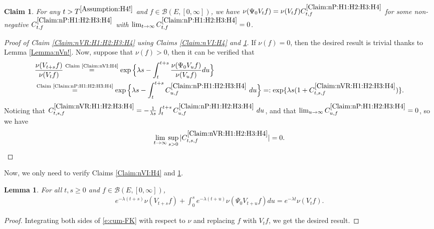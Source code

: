\documentclass[12pt,a4paper]{amsart}
\numberwithin{equation}{section}
\theoremstyle{plain}
\newtheorem{lem}[thm]{Lemma}
\newtheorem{claim}[thm]{Claim}
\theoremstyle{definition}
\theoremstyle{remark}
\newcounter{N}
\newcounter{n}[N]
\begin{document}
\begin{claim} \label{Claim:nP:H1:H2:H3:H4} 
For any $t > T^{\ref{Assumption:H4!}}$ and $f\in \mathcal B(E,[0,\infty])$, we have $\nu(\Psi_0 V_t f) = \nu(V_tf) C^{\ref{Claim:nP:H1:H2:H3:H4}}_{t,f}$ for some non-negative $C^{\ref{Claim:nP:H1:H2:H3:H4}}_{t,f}$ with $\lim_{t\to \infty}C^{\ref{Claim:nP:H1:H2:H3:H4}}_{t,f} = 0$.
\end{claim}
\begin{proof}[{Proof of Claim \ref{Claim:nVR:H1:H2:H3:H4} using Claims \ref{Claim:nVI:H4} and \ref{Claim:nP:H1:H2:H3:H4}}]
If $\nu(f) = 0$, then the desired result is trivial thanks to Lemma \ref{Lemma:nVn!}. 
Now, suppose that $\nu(f)>0$, then it can be verified that
\begin{align}
&\frac{\nu(V_{t+s} f)} {\nu(V_t f)} 
\overset{\text{Claim \ref{Claim:nVI:H4}}}= \exp \Big\{ \lambda s - \int_t^{t+s} \frac{\nu(\Psi_0 V_u f)}{ \nu(V_u f)} du\Big\}
\\&\overset{\text{Claim \ref{Claim:nP:H1:H2:H3:H4}}}= \exp\Big\{\lambda s- \int_t^{t+s} C^{\ref{Claim:nP:H1:H2:H3:H4}}_{u,f} ~du\Big\}
=: \exp\{\lambda s (1+C^{\ref{Claim:nVR:H1:H2:H3:H4}}_{t,s,f}) \}.
\end{align}
Noticing that $C^{\ref{Claim:nVR:H1:H2:H3:H4}}_{t,s,f} = -\frac{1}{\lambda s}\int_t^{t+s} C^{\ref{Claim:nP:H1:H2:H3:H4}}_{u,f} ~du$, and that $\lim_{u\to \infty}C^{\ref{Claim:nP:H1:H2:H3:H4}}_{u,f} = 0$, so we have 
\[\lim_{t\to \infty} \sup_{s> 0} |C^{\ref{Claim:nVR:H1:H2:H3:H4}}_{t,s,f}| = 0. \qedhere\]
\end{proof}
Now, we only need to verify Claims \ref{Claim:nVI:H4} and \ref{Claim:nP:H1:H2:H3:H4}.
\begin{lem} \label{Lemma:nuP!} 
For all $t, s\geq 0$ and $f\in \mathcal B(E,[0,\infty])$,
\begin{align}
\label{eq:nuP.1}  e^{- \lambda (t+s)} \nu(V_{t+s}f) + \int_0^s e^{- \lambda (t+u)} \nu(\Psi_0 V_{t+u}f) du 
  = e^{- \lambda t} \nu(V_t f).
  \end{align}
\end{lem}
\begin{proof} 
Integrating  both sides of \eqref{e:cum-FK} with respect to $\nu$ and replacing $f$ with $V_t f$, we get the desired result.
\end{proof}
\end{document}
